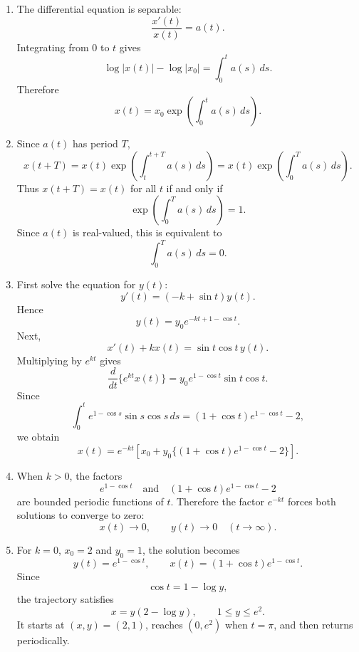 \documentclass[10pt,a4paper]{article}
\begin{document}
\begin{enumerate}
  \item The differential equation is separable:
        \[
          \frac{x'(t)}{x(t)}=a(t).
        \]
        Integrating from $0$ to $t$ gives
        \[
          \log |x(t)|-\log |x_0|=\int_0^t a(s)\,ds.
        \]
        Therefore
        \[
          \boxed{
          x(t)=x_0\exp\left(\int_0^t a(s)\,ds\right).}
        \]

  \item Since $a(t)$ has period $T$,
        \[
          x(t+T)
          =
          x(t)
          \exp\left(\int_t^{t+T}a(s)\,ds\right)
          =
          x(t)
          \exp\left(\int_0^T a(s)\,ds\right).
        \]
        Thus $x(t+T)=x(t)$ for all $t$ if and only if
        \[
          \exp\left(\int_0^T a(s)\,ds\right)=1.
        \]
        Since $a(t)$ is real-valued, this is equivalent to
        \[
          \boxed{\int_0^T a(s)\,ds=0.}
        \]

  \item First solve the equation for $y(t)$:
        \[
          y'(t)=(-k+\sin t)y(t).
        \]
        Hence
        \[
          \boxed{
          y(t)=y_0e^{-kt+1-\cos t}.}
        \]
        Next,
        \[
          x'(t)+kx(t)=\sin t\cos t\,y(t).
        \]
        Multiplying by $e^{kt}$ gives
        \[
          \frac{d}{dt}\{e^{kt}x(t)\}
          =
          y_0e^{1-\cos t}\sin t\cos t.
        \]
        Since
        \[
          \int_0^t e^{1-\cos s}\sin s\cos s\,ds
          =
          (1+\cos t)e^{1-\cos t}-2,
        \]
        we obtain
        \[
          \boxed{
          x(t)=e^{-kt}
          \left[
          x_0+y_0\{(1+\cos t)e^{1-\cos t}-2\}
          \right].}
        \]

  \item When $k>0$, the factors
        \[
          e^{1-\cos t}
          \quad\text{and}\quad
          (1+\cos t)e^{1-\cos t}-2
        \]
        are bounded periodic functions of $t$. Therefore the factor $e^{-kt}$ forces both solutions to converge to zero:
        \[
          \boxed{x(t)\to 0,\qquad y(t)\to 0\quad (t\to\infty).}
        \]

  \item For $k=0$, $x_0=2$ and $y_0=1$, the solution becomes
        \[
          y(t)=e^{1-\cos t},
          \qquad
          x(t)=(1+\cos t)e^{1-\cos t}.
        \]
        Since
        \[
          \cos t=1-\log y,
        \]
        the trajectory satisfies
        \[
          \boxed{x=y(2-\log y),\qquad 1\leq y\leq e^2.}
        \]
        It starts at $(x,y)=(2,1)$, reaches $(0,e^2)$ when $t=\pi$, and then returns periodically.


\end{enumerate}
\end{document}
